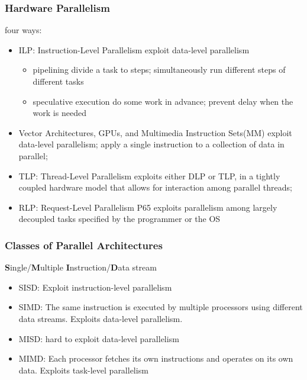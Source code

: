 \subsubsection{Hardware Parallelism}
four ways:
\begin{itemize}\small
    \item ILP: Instruction-Level Parallelism
    \subitem exploit data-level parallelism
    \begin{itemize}
        \item pipelining
        \subitem divide a task to steps;
        \subitem simultaneously run different steps of different tasks
        \item speculative execution
        \subitem do some work in advance;
        \subitem prevent delay when the work is needed
    \end{itemize}
    \item Vector Architectures, GPUs, and Multimedia Instruction Sets(MM)%
    \subitem exploit data-level parallelism;
    \subitem apply a single instruction to a collection of data in parallel;
    \item TLP: Thread-Level Parallelism %
    \subitem exploits either DLP or TLP,
    \subitem in a tightly coupled hardware model that allows for interaction among parallel threads;
    \item RLP: Request-Level Parallelism P65
    \subitem exploits parallelism among largely decoupled tasks specified by the programmer or the OS
\end{itemize}

\subsubsection{Classes of Parallel Architectures}
\textbf{S}ingle/\textbf{M}ultiple \textbf{I}nstruction/\textbf{D}ata stream
\begin{itemize}
    \item SISD: Exploit instruction-level parallelism
    \item SIMD: The same instruction is executed by multiple processors using different data streams. Exploits data-level parallelism.
    \item MISD: hard to exploit data-level parallelism
    \item MIMD: Each processor fetches its own instructions and operates on its own data. Exploits task-level parallelism
\end{itemize}


